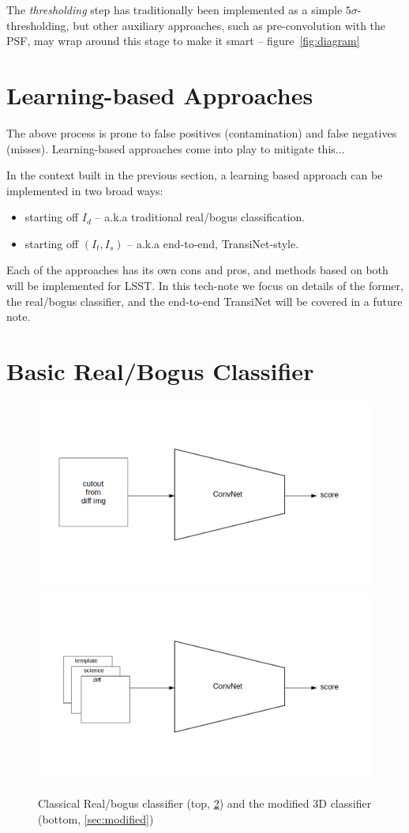 The \emph{thresholding} step has traditionally been implemented as a simple $5\sigma$-thresholding, but other auxiliary approaches, such as pre-convolution with the PSF, may wrap around this stage to make it smart -- figure~\ref{fig:diagram}


\section{Learning-based Approaches}
\label{sec:learning}
The above process is prone to false positives (contamination) and false negatives (misses). Learning-based approaches come into play to mitigate this...

In the context built in the previous section, a learning based approach can be implemented in two broad ways:
\begin{itemize}
\item starting off $I_d$ -- a.k.a traditional real/bogus classification.
\item starting off $(I_t,I_s)$ -- a.k.a end-to-end, TransiNet-style.
\end{itemize}


Each of the approaches has its own cons and pros, and methods based on both will be implemented for LSST. In this tech-note we focus on details of the former, the real/bogus classifier, and the end-to-end TransiNet will be covered in a future note.


\section{Basic Real/Bogus Classifier}
\label{sec:basic}

\begin{figure}[h]
  \centering
  \includegraphics[width=.6\textwidth]{material/rb-classifier}
  \includegraphics[width=.6\textwidth]{material/rb-classifier-mod}
  \caption{Classical Real/bogus classifier (top, \cref{sec:basic}) and the modified 3D classifier (bottom,  \cref{sec:modified})}
  \label{fig:rbdiagram}
\end{figure}

